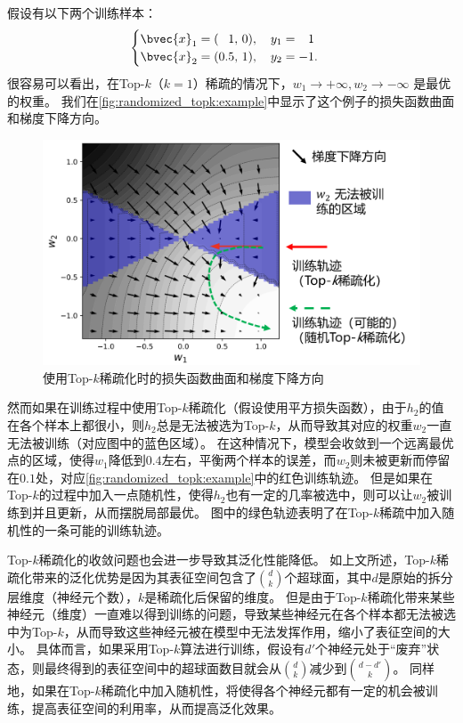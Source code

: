 假设有以下两个训练样本：
\begin{equation}
\begin{cases}
    \bvec{x}_1 = (\phantom{0.}1, \, 0), \quad y_1 = \phantom{-}1 \\
    \bvec{x}_2 = (          0.5, \, 1), \quad y_2 = -1.
\end{cases}
\end{equation}
%
很容易可以看出，在Top-$k$（$k=1$）稀疏的情况下，$w_1 \to +\infty, w_2 \to -\infty$ 是最优的权重。
%
我们在\autoref{fig:randomized_topk:example}中显示了这个例子的损失函数曲面和梯度下降方向。


\begin{figure}[htbp]
    \centering
    \includegraphics[width=0.75\linewidth]{Z_Resources/randtopk_example.png}
    \caption{使用Top-$k$稀疏化时的损失函数曲面和梯度下降方向}
    \label{fig:randomized_topk:example}
\end{figure}



然而如果在训练过程中使用Top-$k$稀疏化（假设使用平方损失函数），由于$h_2$的值在各个样本上都很小，则$h_2$总是无法被选为Top-$k$，从而导致其对应的权重$w_2$一直无法被训练（对应图中的蓝色区域）。
%
在这种情况下，模型会收敛到一个远离最优点的区域，使得$w_1$降低到$0.4$左右，平衡两个样本的误差，而$w_2$则未被更新而停留在$0.1$处，对应\autoref{fig:randomized_topk:example}中的红色训练轨迹。
%
但是如果在Top-$k$的过程中加入一点随机性，使得$h_2$也有一定的几率被选中，则可以让$w_2$被训练到并且更新，从而摆脱局部最优。
图中的绿色轨迹表明了在Top-$k$稀疏中加入随机性的一条可能的训练轨迹。


Top-$k$稀疏化的收敛问题也会进一步导致其泛化性能降低。
%
如上文所述，Top-$k$稀疏化带来的泛化优势是因为其表征空间包含了$d \choose k$个超球面，其中$d$是原始的拆分层维度（神经元个数），$k$是稀疏化后保留的维度。
%
但是由于Top-$k$稀疏化带来某些神经元（维度）一直难以得到训练的问题，导致某些神经元在各个样本都无法被选中为Top-$k$，从而导致这些神经元被在模型中无法发挥作用，缩小了表征空间的大小。
%
具体而言，如果采用Top-$k$算法进行训练，假设有$d'$个神经元处于“废弃”状态，则最终得到的表征空间中的超球面数目就会从$d \choose k$减少到$d - d' \choose k$。
%
同样地，如果在Top-$k$稀疏化中加入随机性，将使得各个神经元都有一定的机会被训练，提高表征空间的利用率，从而提高泛化效果。


